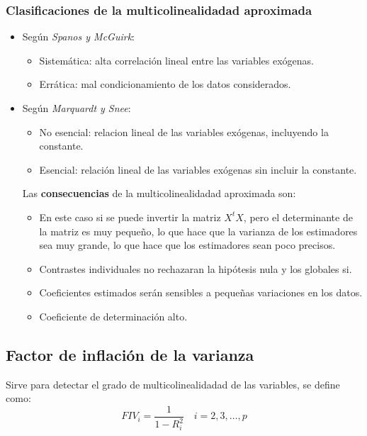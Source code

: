 \documentclass[a4paper,12pt]{article}
\newcommand{\ecuacion}[1]{\ensuremath{#1}}
\begin{document}
\begin{itemize}
    \subsubsection{Clasificaciones de la multicolinealidadad aproximada}
    \begin{itemize}
        \item Según \textit{Spanos y McGuirk}:
        \begin{itemize}
            \item Sistemática: alta correlación lineal entre las variables exógenas.
            \item Errática: mal condicionamiento de los datos considerados.
        \end{itemize}
        \item Según \textit{Marquardt y Snee}:
        \begin{itemize}
            \item No esencial: relacion lineal de las variables exógenas, incluyendo la constante.
            \item Esencial: relación lineal de las variables exógenas sin incluir la constante.
        \end{itemize}
        Las \textbf{consecuencias} de la multicolinealidadad aproximada son:
        \begin{itemize}
            \item En este caso si se puede invertir la matriz \ecuacion{X^tX}, pero el determinante de la matriz es muy pequeño, lo que hace que la varianza de los estimadores sea muy grande, lo que hace que los estimadores sean poco precisos.
            \item Contrastes individuales no rechazaran la hipótesis nula y los globales si.
            \item Coeficientes estimados serán sensibles a pequeñas variaciones en los datos.
            \item Coeficiente de determinación alto.
        \end{itemize}
    \end{itemize}
\end{itemize}

\subsection{Factor de inflación de la varianza}

Sirve para detectar el grado de multicolinealidadad de las variables, se define como:
\begin{equation}
    FIV_i = \frac{1}{1-R_i^2} \quad i = 2, 3, \ldots, p
\end{equation}
\end{document}
